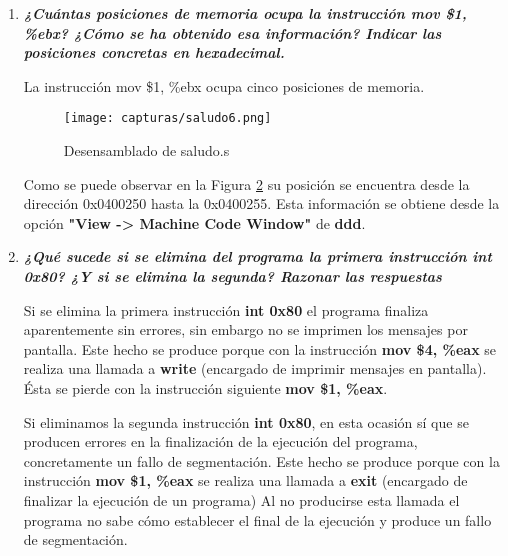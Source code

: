 \begin{enumerate}
	\begin{figure}[H] %
		\centering
		\texttt{[image: capturas/saludo3.png]}  
		\caption{Depuración de saludo.s} 
		\label{fig:figura5}
	\end{figure}
	
	Como se observa en la Figura \ref{fig:figura5}, el valor de \textbf{ECX} ahora es \textbf{0x616c6f48}, que es la representación en hexadecimal de la cadena de texto almacenada en \textbf{saludo}.
	
	\item \textbf{\textit{¿Cuántas posiciones de memoria ocupa la instrucción mov \$1, \%ebx? ¿Cómo se ha obtenido esa información? Indicar las posiciones concretas en hexadecimal.}}
	
	La instrucción mov \$1, \%ebx ocupa cinco posiciones de memoria.
	\begin{figure}[H] %
		\centering
		\texttt{[image: capturas/saludo6.png]}  
		\caption{Desensamblado de saludo.s} 
		\label{fig:figura6}
	\end{figure}
	
	Como se puede observar en la Figura \ref{fig:figura6} su posición se encuentra desde la dirección 0x0400250 hasta la 0x0400255. Esta información se obtiene desde la opción \textbf{"View -> Machine Code Window"} de \textbf{ddd}.
	
	\item \textbf{\textit{¿Qué sucede si se elimina del programa la primera instrucción int 0x80? ¿Y si se elimina la segunda? Razonar las respuestas}}
	
	Si se elimina la primera instrucción \textbf{int 0x80} el programa finaliza aparentemente sin errores, sin embargo no se imprimen los mensajes por pantalla.	
	Este hecho se produce porque con la instrucción \textbf{mov \$4, \%eax} se realiza una llamada a \textbf{write} (encargado de imprimir mensajes en pantalla). Ésta se pierde con la instrucción siguiente \textbf{mov \$1, \%eax}.
		
	Si eliminamos la segunda instrucción \textbf{int 0x80}, en esta ocasión sí que se producen errores en la finalización de la ejecución del programa, concretamente un fallo de segmentación. 	
	Este hecho se produce porque con la instrucción \textbf{mov \$1, \%eax} se realiza una llamada a \textbf{exit} (encargado de finalizar la ejecución de un programa) Al no producirse esta llamada el programa no sabe cómo establecer el final de la ejecución y produce un fallo de segmentación.
	

\end{enumerate}
